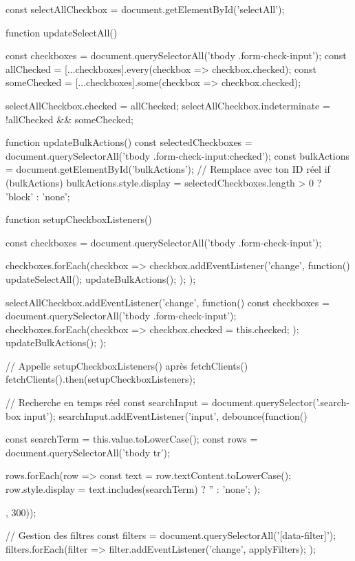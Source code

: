 {    const selectAllCheckbox = document.getElementById('selectAll');

    function updateSelectAll() {
        const checkboxes = document.querySelectorAll('tbody .form-check-input');
        const allChecked = [...checkboxes].every(checkbox => checkbox.checked);
        const someChecked = [...checkboxes].some(checkbox => checkbox.checked);

        selectAllCheckbox.checked = allChecked;
        selectAllCheckbox.indeterminate = !allChecked && someChecked;
    }

    function updateBulkActions() {
        const selectedCheckboxes = document.querySelectorAll('tbody .form-check-input:checked');
        const bulkActions = document.getElementById('bulkActions'); // Remplace avec ton ID réel
        if (bulkActions) {
            bulkActions.style.display = selectedCheckboxes.length > 0 ? 'block' : 'none';
        }
    }

    function setupCheckboxListeners() {
        const checkboxes = document.querySelectorAll('tbody .form-check-input');

        checkboxes.forEach(checkbox => {
            checkbox.addEventListener('change', function() {
                updateSelectAll();
                updateBulkActions();
            });
        });
    }

    selectAllCheckbox.addEventListener('change', function() {
        const checkboxes = document.querySelectorAll('tbody .form-check-input');
        checkboxes.forEach(checkbox => {
            checkbox.checked = this.checked;
        });
        updateBulkActions();
    });

    // Appelle setupCheckboxListeners() après fetchClients()
    fetchClients().then(setupCheckboxListeners);

    // Recherche en temps réel
    const searchInput = document.querySelector('.search-box input');
    searchInput.addEventListener('input', debounce(function() {
        const searchTerm = this.value.toLowerCase();
        const rows = document.querySelectorAll('tbody tr');

        rows.forEach(row => {
            const text = row.textContent.toLowerCase();
            row.style.display = text.includes(searchTerm) ? '' : 'none';
        });
    }, 300));

    // Gestion des filtres
    const filters = document.querySelectorAll('[data-filter]');
    filters.forEach(filter => {
        filter.addEventListener('change', applyFilters);
    });

}
